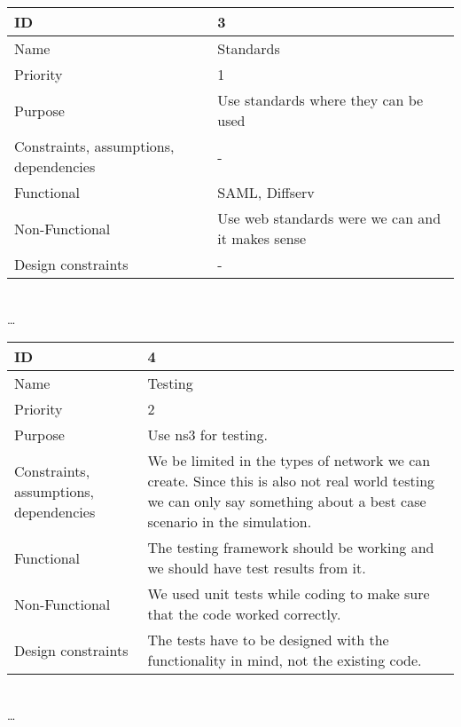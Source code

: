 \begin{center}
	\begin{tabular}{| p{4cm} | p{8cm} |}
		\hline
		ID & 3 \\
		\hline
		Name & Standards \\
		\hline
		Priority & 1 \\
		\hline
		Purpose & Use standards where they can be used \\
		\hline 
		Constraints, assumptions, dependencies & -\\
		\hline  
		Functional & SAML, Diffserv \\
		\hline
		Non-Functional & Use web standards were we can and it makes sense \\ 
		\hline
		Design constraints & - \\
		\hline
	\end{tabular}
	\\  \ldots  \\

	\begin{tabular}{| p{4cm} | p{8cm} |}
		\hline
		ID & 4 \\
		\hline
		Name & Testing  \\
		\hline
		Priority & 2 \\
		\hline
		Purpose & Use \gls{ns3} for testing. \\
		\hline 
		Constraints, assumptions, dependencies & We be limited in the types of network we can create. Since this is also not real world testing we can only say something about a best case scenario in the simulation.\\
		\hline  
		Functional & The testing framework should be working and we should have test results from it.\\
		\hline
		Non-Functional & We used unit tests while coding to make sure that the code worked correctly. \\ 
		\hline
		Design constraints & The tests have to be designed with the functionality in mind, not the existing code. \\
		\hline
	\end{tabular}
	\\  \ldots  \\


\end{center}
